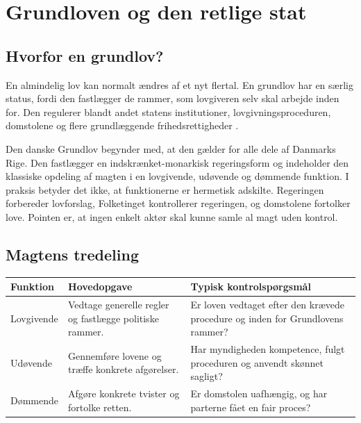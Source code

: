\chapter{Grundloven og den retlige stat}


\section{Hvorfor en grundlov?}

En almindelig lov kan normalt ændres af et nyt flertal. En grundlov har en særlig status, fordi den fastlægger de rammer, som lovgiveren selv skal arbejde inden for. Den regulerer blandt andet statens institutioner, lovgivningsproceduren, domstolene og flere grundlæggende frihedsrettigheder \citep{grundloven}.

Den danske Grundlov begynder med, at den gælder for alle dele af Danmarks Rige. Den fastlægger en indskrænket-monarkisk regeringsform og indeholder den klassiske opdeling af magten i en lovgivende, udøvende og dømmende funktion. I praksis betyder det ikke, at funktionerne er hermetisk adskilte. Regeringen forbereder lovforslag, Folketinget kontrollerer regeringen, og domstolene fortolker love. Pointen er, at ingen enkelt aktør skal kunne samle al magt uden kontrol.

\section{Magtens tredeling}

\begin{tabularx}{\textwidth}{@{}>{\RaggedRight\arraybackslash}p{2.6cm}X X@{}}
\toprule
\textbf{Funktion} & \textbf{Hovedopgave} & \textbf{Typisk kontrolspørgsmål} \\
\midrule
Lovgivende & Vedtage generelle regler og fastlægge politiske rammer. & Er loven vedtaget efter den krævede procedure og inden for Grundlovens rammer? \\
Udøvende & Gennemføre lovene og træffe konkrete afgørelser. & Har myndigheden kompetence, fulgt proceduren og anvendt skønnet sagligt? \\
Dømmende & Afgøre konkrete tvister og fortolke retten. & Er domstolen uafhængig, og har parterne fået en fair proces? \\
\bottomrule
\end{tabularx}


